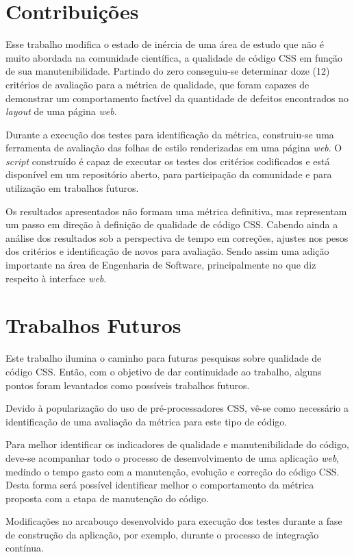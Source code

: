\section{Contribuições}

Esse trabalho modifica o estado de inércia de uma área de estudo que não é muito abordada na comunidade científica, a qualidade de código CSS em função de sua manutenibilidade. Partindo do zero conseguiu-se determinar doze (12) critérios de avaliação para a métrica de qualidade, que foram capazes de demonstrar um comportamento factível da quantidade de defeitos encontrados no \textit{layout} de uma página \textit{web}. 

Durante a execução dos testes para identificação da métrica, construiu-se uma ferramenta de avaliação das folhas de estilo renderizadas em uma página \textit{web}. O \textit{script} construído é capaz de executar os testes dos critérios codificados e está disponível em um repositório aberto, para participação da comunidade e para utilização em trabalhos futuros.

Os resultados apresentados não formam uma métrica definitiva, mas representam um passo em direção à definição de qualidade de código CSS. Cabendo ainda a análise dos resultados sob a perspectiva de tempo em correções, ajustes nos pesos dos critérios e identificação de novos  para avaliação. Sendo assim uma adição importante na área de Engenharia de Software, principalmente no que diz respeito à interface \textit{web}.

\section{Trabalhos Futuros}

Este trabalho ilumina o caminho para futuras pesquisas sobre qualidade de código CSS. Então, com o objetivo de dar continuidade ao trabalho, alguns pontos foram levantados como possíveis trabalhos futuros.

Devido à popularização do uso de pré-processadores CSS, vê-se como necessário a identificação de uma avaliação da métrica para este tipo de código.

Para melhor identificar os indicadores de qualidade e manutenibilidade do código, deve-se acompanhar todo o processo de desenvolvimento de uma aplicação \textit{web}, medindo o tempo gasto com a manutenção, evolução e correção do código CSS. Desta forma será possível identificar melhor o comportamento da métrica proposta com a etapa de manutenção do código.

Modificações no arcabouço desenvolvido para execução dos testes durante a fase de construção da aplicação, por exemplo, durante o processo de integração contínua.